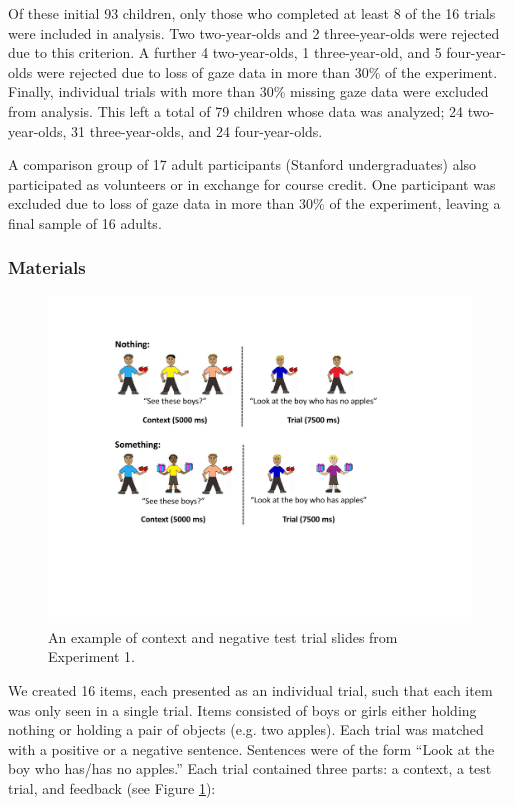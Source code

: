 \documentclass[man]{apa2}
\begin{document}
Of these initial 93 children, only those who completed at least 8 of the 16 trials were included in analysis.  Two two-year-olds and 2 three-year-olds were rejected due to this criterion.  A further 4 two-year-olds, 1 three-year-old, and 5 four-year-olds were rejected due to loss of gaze data in more than 30\% of the experiment.  Finally, individual trials with more than 30\% missing gaze data were excluded from analysis.   This left a total of 79 children whose data was analyzed; 24 two-year-olds, 31 three-year-olds, and 24 four-year-olds. 

A comparison group of 17 adult participants (Stanford undergraduates) also participated as volunteers or in exchange for course credit.  One participant was excluded due to loss of gaze data in more than 30\% of the experiment, leaving a final sample of 16 adults.  

\subsubsection{Materials}

\begin{figure}
\begin{center} 
\includegraphics[width=5in]{trialfigure_nothing.pdf}
\caption{\label{fig:e1stim} An example of context and negative test trial slides from Experiment 1. }
\end{center} 
\end{figure}

We created 16 items, each presented as an individual trial, such that each item was only seen in a single trial.  Items consisted of boys or girls either holding nothing or holding a pair of objects (e.g. two apples).  Each trial was matched with a positive or a negative sentence.  Sentences were of the form ``Look at the boy who has/has no apples.''  Each trial contained three parts: a context, a test trial, and feedback (see Figure \ref{fig:e1stim}):
\end{document}
